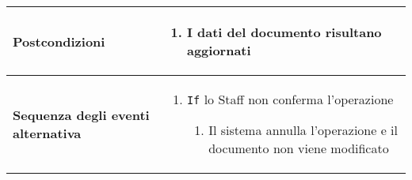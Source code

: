 \documentclass[a4paper]{report}
\begin{document}
\begin{table}[H]
\begin{tabular}{|p{3.9cm}|p{9.9cm}|}
	\textbf{Postcondizioni} & 
    \begin{enumerate}[leftmargin=14pt,label=\arabic*.,labelsep=0.5em,topsep=0pt,partopsep=0pt,parsep=0pt,itemsep=0pt]
        \item I dati del documento risultano aggiornati \end{enumerate} \\ \hline
	\textbf{Sequenza degli eventi alternativa} & 
\begin{enumerate}[leftmargin=14pt,label=\arabic*.,labelsep=0.5em,topsep=0pt,partopsep=0pt,parsep=0pt,itemsep=0pt]
    \item \texttt{If} lo Staff non conferma l’operazione
    \begin{enumerate}[label=\arabic{enumi}.\arabic*.,leftmargin=22pt,labelsep=0.5em,topsep=0pt,partopsep=0pt,parsep=0pt,itemsep=0pt]
        \item Il sistema annulla l’operazione e il documento non viene modificato
    \end{enumerate}
\end{enumerate} \\ \hline
\end{tabular}
\end{table}
\end{document}
